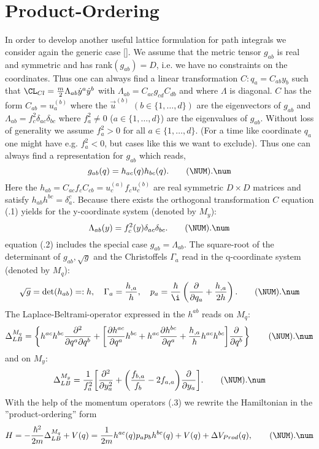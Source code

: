 \section{Product-Ordering}
In order to develop another useful lattice formulation for path
integrals we consider again the generic case [\GROa].
We assume that the metric tensor $g_{ab}$ is real and symmetric
and has rank$(g_{ab})=D$, i.e. we have no constraints on the
coordinates.
Thus one can always find a linear transformation $C:q_a=C_{ab}y_b$
such that $\CL_{Cl}={m\over2}\Lambda_{ab}\dot y^a\dot y^b$
with $\Lambda_{ab}=C_{ac}g_{cd}C_{db}$ and where $\Lambda$ is diagonal.
$C$ has the form $C_{ab}=u_a^{(b)}$ where the ${\vec u}^{(b)}$
$(b\in\{1,\dots,d\})$ are the eigenvectors of $g_{ab}$ and
$\Lambda_{ab}=f_c^2\delta_{ac}\delta_{bc}$ where
$f_a^2\not=0$ ($a\in\{1,\dots,d\}$) are the eigenvalues of $g_{ab}$.
Without loss of generality we assume $f_a^2>0$ for all
$a\in\{1,\dots,d\}$.
(For a time like coordinate $q_a$ one might have e.g.
$f_a^2<0$, but cases like this we want to exclude).
Thus one can always find a representation for $g_{ab}$ which reads,
\plus
$$g_{ab}(q)= h_{ac}(q)h_{bc}(q).
  \tag\NUM.\num$$
Here the $h_{ab}=C_{ac}f_c C_{cb}=u_c^{(a)}f_c u_c^{(b)}$ are real
symmetric $D\times D$ matrices and satisfy $h_{ab}h^{bc}=\delta_a^c$.
Because there exists the orthogonal transformation $C$ equation
(\NUM.1) yields for the y-coordinate system (denoted by $M_y$):
\plus
$$\Lambda_{ab}(y)=f_c^2(y)\delta_{ac}\delta_{bc}.
  \tag\NUM.\num$$
equation (\NUM.2) includes the special case $g_{ab}=\Lambda_{ab}$.
The square-root of the determinant of $g_{ab}, \sqrt{g}$ and the
Christoffels $\Gamma_a$ read in the q-coordinate system (denoted by
$M_q$):
\plus
$$\sqrt{g}=\det(h_{ab})=:h,\quad
  \Gamma_a={h_{,a}\over h},\quad
  p_a={\hbar\over\i}
  \left({\partial\over\partial q_a}+{h_{,a}\over2h}\right).
  \tag\NUM.\num$$
The Laplace-Beltrami-operator expressed in the $h^{ab}$ reads
on $M_q$:
\plus
$$\Delta_{LB}^{M_q}=\left\{h^{ac}h^{bc}
  {\partial^2\over\partial q^a\partial q^b}
  +\bigg[{\partial h^{ac}\over\partial q^a}h^{bc}
  +h^{ac}{\partial h^{bc}\over\partial q^a}
  +{h_{,a}\over h}h^{ac}h^{bc}\bigg]
  {\partial\over\partial q^b}\right\}
  \tag\NUM.\num$$
and on $M_y$:
\plus
$$\Delta_{LB}^{M_y}=
  {1\over f_a^2}\bigg[{\partial^2\over\partial y_a^2}
  +\bigg({f_{b,a}\over f_b}-2f_{a,a}\bigg)
  {\partial\over\partial y_a}\bigg].
  \tag\NUM.\num$$
With the help of the momentum operators (\NUM.3) we rewrite the
Hamiltonian in the ''pro\-duct-ordering'' form
\plus
$$H=-{\hbar^2\over2m}\Delta_{LB}^{M_q}+V(q)
   ={1\over2m} h^{ac}(q)p_a p_b h^{bc}(q)+V(q)+\Delta V_{Prod}(q),
  \tag\NUM.\num$$
